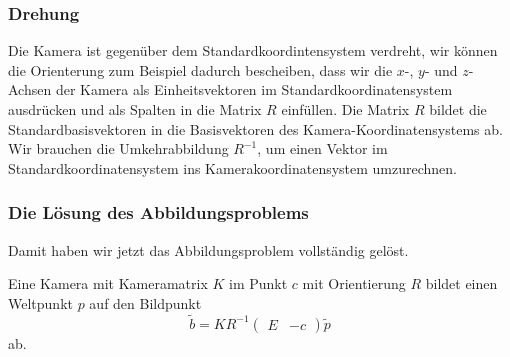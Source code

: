 \subsubsection{Drehung}
Die Kamera ist gegenüber dem Standardkoordintensystem verdreht,
wir können die Orienterung zum Beispiel dadurch bescheiben, dass wir
die $x$-, $y$- und $z$-Achsen der Kamera als Einheitsvektoren im
Standardkoordinatensystem ausdrücken und als Spalten in die Matrix $R$
einfüllen.
Die Matrix $R$ bildet die Standardbasisvektoren in die Basisvektoren
des Kamera-Koordinatensystems ab.
Wir brauchen die Umkehrabbildung $R^{-1}$, um einen Vektor im
Standardkoordinatensystem ins Kamerakoordinatensystem umzurechnen.

\subsubsection{Die Lösung des Abbildungsproblems}
Damit haben wir jetzt das Abbildungsproblem vollständig gelöst.

\begin{satz}
Eine Kamera mit Kameramatrix $K$ im Punkt $c$ mit Orientierung $R$ bildet
einen Weltpunkt $p$ auf den Bildpunkt
\[
\tilde b
=
K R^{-1} \begin{pmatrix} E&-c\end{pmatrix} \tilde p
\]
ab.
\end{satz}

